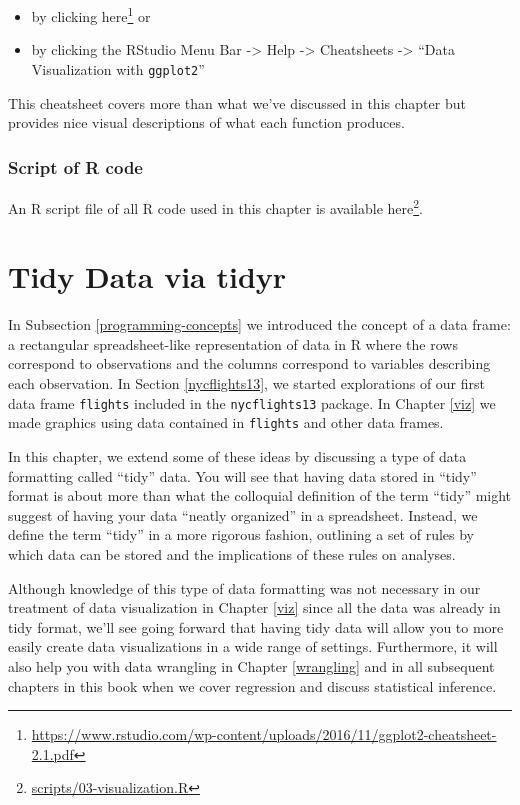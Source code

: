 \documentclass[12pt,]{krantz}
\providecommand{\tightlist}{%
  \setlength{\itemsep}{0pt}\setlength{\parskip}{0pt}}
\renewcommand{\href}[2]{#2\footnote{\url{#1}}}
\theoremstyle{definition}
\theoremstyle{definition}
\theoremstyle{definition}
\theoremstyle{remark}
\begin{document}
\begin{itemize}
\tightlist
\item
  by clicking
  \href{https://www.rstudio.com/wp-content/uploads/2016/11/ggplot2-cheatsheet-2.1.pdf}{here}
  or
\item
  by clicking the RStudio Menu Bar -\textgreater{} Help -\textgreater{}
  Cheatsheets -\textgreater{} ``Data Visualization with
  \texttt{ggplot2}''
\end{itemize}

This cheatsheet covers more than what we've discussed in this chapter
but provides nice visual descriptions of what each function produces.

\subsection{Script of R code}\label{script-of-r-code}

An R script file of all R code used in this chapter is available
\href{scripts/03-visualization.R}{here}.

\chapter{Tidy Data via tidyr}\label{tidy}

In Subsection \ref{programming-concepts} we introduced the concept of a
data frame: a rectangular spreadsheet-like representation of data in R
where the rows correspond to observations and the columns correspond to
variables describing each observation. In Section \ref{nycflights13}, we
started explorations of our first data frame \texttt{flights} included
in the \texttt{nycflights13} package. In Chapter \ref{viz} we made
graphics using data contained in \texttt{flights} and other data frames.

In this chapter, we extend some of these ideas by discussing a type of
data formatting called ``tidy'' data. You will see that having data
stored in ``tidy'' format is about more than what the colloquial
definition of the term ``tidy'' might suggest of having your data
``neatly organized'' in a spreadsheet. Instead, we define the term
``tidy'' in a more rigorous fashion, outlining a set of rules by which
data can be stored and the implications of these rules on analyses.

Although knowledge of this type of data formatting was not necessary in
our treatment of data visualization in Chapter \ref{viz} since all the
data was already in tidy format, we'll see going forward that having
tidy data will allow you to more easily create data visualizations in a
wide range of settings. Furthermore, it will also help you with data
wrangling in Chapter \ref{wrangling} and in all subsequent chapters in
this book when we cover regression and discuss statistical inference.
\end{document}
